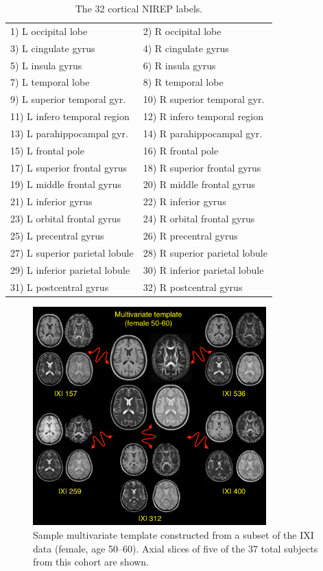 \begin{table}
\centering
\begin{tabular*}{0.475\textwidth}{@{\extracolsep{\fill}} l l}
\toprule
  1) L occipital lobe & 2) R occipital lobe \\
  3) L cingulate gyrus & 4) R cingulate gyrus \\
  5) L insula gyrus & 6) R insula gyrus \\
  7) L temporal lobe & 8) R temporal lobe \\
  9) L superior temporal gyr. & 10) R superior temporal gyr. \\
  11) L infero temporal region & 12) R infero temporal region \\
  13) L parahippocampal gyr. & 14) R parahippocampal gyr. \\
  15) L frontal pole & 16) R frontal pole \\
  17) L superior frontal gyrus & 18) R superior frontal gyrus \\
  19) L middle frontal gyrus & 20) R middle frontal gyrus \\
  21) L inferior gyrus & 22) R inferior gyrus \\
  23) L orbital frontal gyrus & 24) R orbital frontal gyrus \\
  25) L precentral gyrus & 26) R precentral gyrus \\
  27) L superior parietal lobule & 28) R superior parietal lobule \\
  29) L inferior parietal lobule & 30) R inferior parietal lobule \\
  31) L postcentral gyrus & 32)   R postcentral gyrus \\  
\bottomrule
\end{tabular*}
\caption{The 32 cortical NIREP labels.}
\label{table:nirep_labels}
\end{table}


\begin{figure}
  \centering
  \includegraphics[width=90mm]{figs/template50_60.pdf}
  \caption{Sample multivariate template constructed from a subset of the IXI data (female, age 50--60).  Axial slices of five of the 37 total subjects from this cohort are shown. }
  \label{fig:template}
\end{figure}


